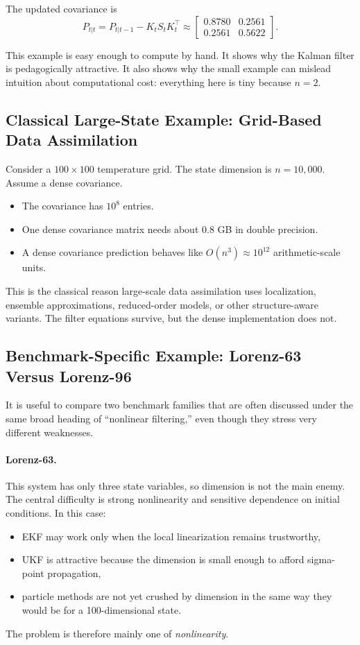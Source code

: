 \documentclass[12pt,a4paper]{article}
\begin{document}
The updated covariance is
\[
P_{t|t}
=
P_{t|t-1} - K_t S_t K_t^\top
\approx
\begin{bmatrix}
0.8780 & 0.2561\\
0.2561 & 0.5622
\end{bmatrix}.
\]

This example is easy enough to compute by hand. It shows why the Kalman filter is pedagogically attractive. It also shows why the small example can mislead intuition about computational cost: everything here is tiny because \(n=2\).

\subsection{Classical Large-State Example: Grid-Based Data Assimilation}\label{app:classic-grid}

Consider a \(100 \times 100\) temperature grid. The state dimension is \(n=10{,}000\). Assume a dense covariance.

\begin{itemize}
  \item The covariance has \(10^8\) entries.
  \item One dense covariance matrix needs about \(0.8\) GB in double precision.
  \item A dense covariance prediction behaves like \(O(n^3) \approx 10^{12}\) arithmetic-scale units.
\end{itemize}

This is the classical reason large-scale data assimilation uses localization, ensemble approximations, reduced-order models, or other structure-aware variants. The filter equations survive, but the dense implementation does not.

\subsection{Benchmark-Specific Example: Lorenz-63 Versus Lorenz-96}\label{app:classic-lorenz}

It is useful to compare two benchmark families that are often discussed under the same broad heading of ``nonlinear filtering,'' even though they stress very different weaknesses.

\paragraph{Lorenz-63.}
This system has only three state variables, so dimension is not the main enemy. The central difficulty is strong nonlinearity and sensitive dependence on initial conditions. In this case:
\begin{itemize}
  \item EKF may work only when the local linearization remains trustworthy,
  \item UKF is attractive because the dimension is small enough to afford sigma-point propagation,
  \item particle methods are not yet crushed by dimension in the same way they would be for a 100-dimensional state.
\end{itemize}
The problem is therefore mainly one of \emph{nonlinearity}.
\end{document}
